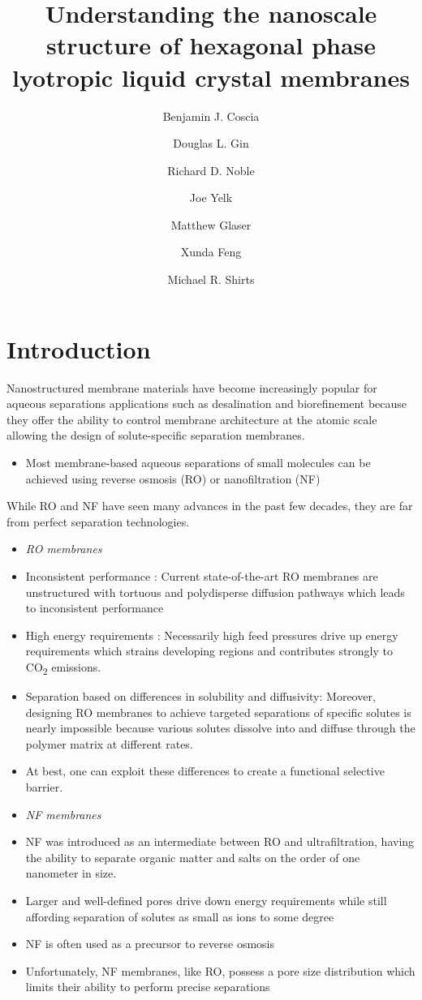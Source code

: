 \documentclass{article}
\title{Understanding the nanoscale structure of hexagonal phase lyotropic liquid crystal membranes}
\author{Benjamin J. Coscia \and Douglas L. Gin \and Richard D. Noble \and Joe Yelk \and Matthew Glaser \and Xunda Feng \and Michael R. Shirts}
\begin{document}
  
  \graphicspath{{./figures/}}
  \maketitle
  \section*{Introduction}
  
  Nanostructured membrane materials have become increasingly popular for 
  aqueous separations applications such as desalination and biorefinement
  because they offer the ability to control membrane architecture at the
  atomic scale allowing the design of solute-specific separation membranes. \cite{humplik_nanostructured_2011}
  \begin{itemize}
    \item Most membrane-based aqueous separations of small molecules can 
    be achieved using reverse osmosis (RO) or nanofiltration (NF) \cite{van_der_bruggen_review_2003}
  \end{itemize}
  
  While RO and NF have seen many advances in the past few decades, they 
  are far from perfect separation technologies.
  \begin{itemize}
    \item \textit{RO membranes}
    \item Inconsistent performance : Current state-of-the-art RO membranes are unstructured with
    tortuous and polydisperse diffusion pathways which leads to 
    inconsistent performance \cite{song_nano_2011}
    \item High energy requirements : Necessarily high feed pressures 
    drive up energy requirements which strains developing regions and
    contributes strongly to CO\textsubscript{2} emissions. \cite{mcginnis_global_2008}
    \item Separation based on differences in solubility and diffusivity:
    Moreover, designing RO membranes to achieve targeted separations of 
    specific solutes is nearly impossible because various solutes dissolve
    into and diffuse through the polymer matrix at different rates. \cite{wijmans_solution-diffusion_1995}
    \item At best, one can exploit these differences to create a functional
    selective barrier.
    \item \textit{NF membranes}
    \item NF was introduced as an intermediate between RO and ultrafiltration,
    having the ability to separate organic matter and salts on the order of 
    one nanometer in size.
    \item Larger and well-defined pores drive down energy requirements while
    still affording separation of solutes as small as ions to some degree \cite{van_der_bruggen_review_2003}
    \item NF is often used as a precursor to reverse osmosis
    \item Unfortunately, NF membranes, like RO, possess a pore size 
    distribution which limits their ability to perform precise separations \cite{bowen_modelling_2002}
  \end{itemize}
  
\end{document}

